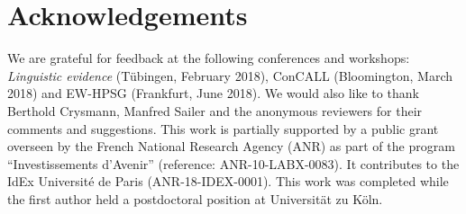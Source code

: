 \documentclass[output=paper]{langsci/langscibook}
\begin{document}
\section*{Acknowledgements}
\begin{sloppypar}
  We are grateful for feedback at the following conferences and
  workshops: \textit{Linguistic evidence} (Tübingen, February 2018), ConCALL
  (Bloomington, March 2018) and EW-HPSG (Frankfurt, June 2018). We
  would also like to thank Berthold Crysmann, Manfred Sailer and the
  anonymous reviewers for their comments and suggestions.  This work
  is partially supported by a public grant overseen by the French
  National Research Agency (ANR) as part of the program
  ``Investissements d’Avenir'' (reference: ANR-10-LABX-0083). It
  contributes to the IdEx Université de Paris (ANR-18-IDEX-0001).
  This work was completed while the first author held a postdoctoral
  position at Universität zu Köln.
\end{sloppypar}
{\sloppy\printbibliography[heading=subbibliography,notkeyword=this]}
\end{document}
